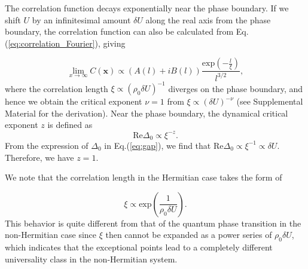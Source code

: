 \documentclass[aps,prl,twocolumn,nofootinbib,superscriptaddress,longbibliography]{revtex4-1}
\begin{document}
	The correlation function decays exponentially near the phase boundary. If we
	shift $U$ by an infinitesimal amount $\delta U$ along the real axis from the phase boundary, the correlation function can also be calculated from Eq. (\ref{eq:correlation_Fourier}), giving
	
	\begin{equation}
	\lim_{x\rightarrow\infty}C(\bm{x})\propto(A(l)+iB(l))\frac{\text{exp}(-\frac{l}{\xi})}{l^{3/2}}\label{eq:exponential_decay},
	\end{equation}
	where the correlation length $\xi\propto(\rho_{0}\delta U)^{-1}$ diverges on the phase boundary, and hence we obtain the critical exponent $\nu=1$ from $\xi\propto(\delta U)^{-\nu}$ \cite{Sachdev:2011uj} (see Supplemental Material \cite{SupplementaryMaterial} for the derivation). 
	Near the phase boundary, the dynamical critical exponent $z$ is defined as
	\begin{equation}
		\text{Re}\Delta_0\propto\xi^{-z}.
	\end{equation}
	From the expression of $\Delta_0$ in Eq.(\ref{eq:gap}), we find that $\text{Re}\Delta_0\propto\xi^{-1}\propto\delta U$. Therefore, we have $z=1$. 
	
	We note that the correlation length in the Hermitian case takes the form of
	
	\begin{equation}
	\xi\propto\text{exp}(\frac{1}{\rho_{0}\delta U}).
	\end{equation}
	This behavior is quite different from that of the quantum phase transition in the non-Hermitian
	case since $\xi$ then cannot be expanded as a power series of $\rho_{0}\delta U$,
	which indicates that the exceptional points lead to a completely
	different universality class in the non-Hermitian system.
	
\end{document}
